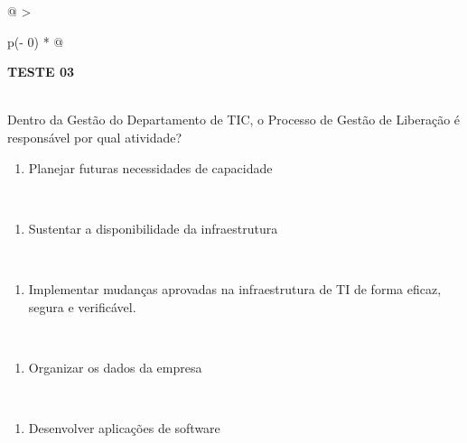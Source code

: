 \documentclass[
]{book}
\providecommand{\tightlist}{%
  \setlength{\itemsep}{0pt}\setlength{\parskip}{0pt}}
\begin{document}
\begin{longtable}[]{@{}
  >{\raggedright\arraybackslash}p{(\columnwidth - 0\tabcolsep) * }@{}}
\toprule\noalign{}
\begin{minipage}[b]{\linewidth}\raggedright
\textbf{TESTE 03}
\end{minipage} \\
\midrule\noalign{}
\endhead
\bottomrule\noalign{}
\endlastfoot
Dentro da Gestão do Departamento de TIC, o Processo de Gestão de Liberação é responsável por qual atividade? \\
\begin{minipage}[t]{\linewidth}\raggedright
\begin{enumerate}
\def\labelenumi{\Alph{enumi})}
\tightlist
\item
  Planejar futuras necessidades de capacidade
\end{enumerate}
\end{minipage} \\
\begin{minipage}[t]{\linewidth}\raggedright
\begin{enumerate}
\def\labelenumi{\Alph{enumi})}
\setcounter{enumi}{1}
\tightlist
\item
  Sustentar a disponibilidade da infraestrutura
\end{enumerate}
\end{minipage} \\
\begin{minipage}[t]{\linewidth}\raggedright
\begin{enumerate}
\def\labelenumi{\Alph{enumi})}
\setcounter{enumi}{2}
\tightlist
\item
  Implementar mudanças aprovadas na infraestrutura de TI de forma eficaz, segura e verificável.
\end{enumerate}
\end{minipage} \\
\begin{minipage}[t]{\linewidth}\raggedright
\begin{enumerate}
\def\labelenumi{\Alph{enumi})}
\setcounter{enumi}{3}
\tightlist
\item
  Organizar os dados da empresa
\end{enumerate}
\end{minipage} \\
\begin{minipage}[t]{\linewidth}\raggedright
\begin{enumerate}
\def\labelenumi{\Alph{enumi})}
\setcounter{enumi}{4}
\tightlist
\item
  Desenvolver aplicações de software
\end{enumerate}
\end{minipage} \\
\end{longtable}
\end{document}
